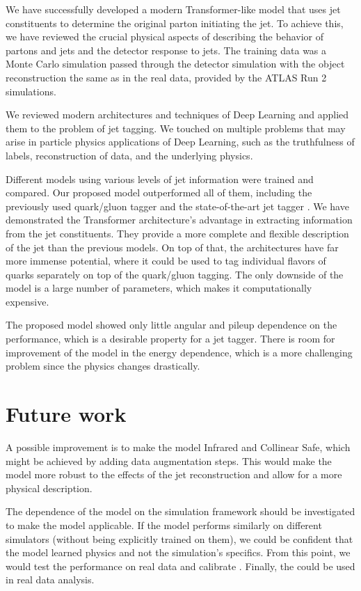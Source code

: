 

We have successfully developed a modern Transformer-like model that uses jet constituents to determine the original parton initiating the jet.
To achieve this, we have reviewed the crucial physical aspects of \QCD describing the behavior of partons and jets and the detector response to jets.
The training data was a Monte Carlo simulation passed through the detector simulation with the object reconstruction the same as in the real data, provided by the ATLAS Run 2 simulations.

We reviewed modern architectures and techniques of Deep Learning and applied them to the problem of jet tagging.
We touched on multiple problems that may arise in particle physics applications of Deep Learning, such as the truthfulness of labels, reconstruction of data, and the underlying physics.

Different models using various levels of jet information were trained and compared.
Our proposed \depart model outperformed all of them, including the previously used quark/gluon tagger and the state-of-the-art jet tagger \ParT.
We have demonstrated the Transformer architecture's advantage in extracting information from the jet constituents.
They provide a more complete and flexible description of the jet than the previous models.
On top of that, the \trans architectures have far more immense potential, where it could be used to tag individual flavors of quarks separately on top of the quark/gluon tagging. 
The only downside of the model is a large number of parameters, which makes it computationally expensive.

The proposed model showed only little angular and pileup dependence on the performance, which is a desirable property for a jet tagger. 
There is room for improvement of the model in the energy dependence, which is a more challenging problem since the physics changes drastically.

\section*{Future work}
A possible improvement is to make the model Infrared and Collinear Safe, which might be achieved by adding data augmentation steps.
This would make the model more robust to the effects of the jet reconstruction and allow for a more physical description.

The dependence of the model on the simulation framework should be investigated to make the model applicable. 
If the model performs similarly on different simulators (without being explicitly trained on them), we could be confident that the model learned physics and not the simulation's specifics. 
From this point, we would test the performance on real data and calibrate \MC.
Finally, the \depart could be used in real data analysis.